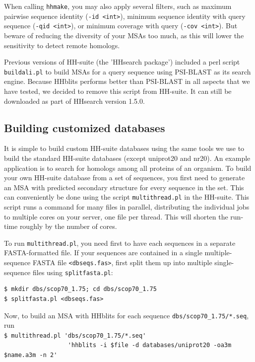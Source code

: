 \documentclass[11pt,a4paper]{article}
\begin{document}
When calling \verb`hhmake`, you may also apply several filters, such as maximum pairwise 
sequence identity (\verb`-id <int>`), minimum sequence identity with query sequence 
(\verb`-qid <int>`), or minimum coverage with query (\verb`-cov <int>`). But beware 
of reducing the diversity of your MSAs too much, as this will lower the sensitivity to
detect remote homologs.

Previous versions of HH-suite (the 'HHsearch package') included a perl script \verb`buildali.pl` to build MSAs for a query sequence using PSI-BLAST as its search engine. Because HHblits performs better than PSI-BLAST in all aspects that we have tested, we decided to remove this script from HH-suite. It can still be downloaded as part of HHsearch version 1.5.0.


\subsection{Building customized databases} \label{building_dbs}

It is simple to build custom HH-suite databases using the same tools we use to build the standard HH-suite databases (except uniprot20 and nr20). An example application is to search for homologs among all proteins of an organism. To build your own HH-suite database from a set of sequences, you first need to generate an MSA with predicted secondary structure for every sequence in the set. This can conveniently be done using the script \verb`multithread.pl` in the HH-suite. This script runs a command for many files in parallel, distributing the individual jobs to multiple cores on your server, one file per thread. This will shorten the run-time roughly by the number of cores. 

To run \verb`multithread.pl`, you need first to have each sequences in a separate FASTA-formatted file. If your sequences are contained in a single multiple-sequence FASTA file \verb`<dbseqs.fas>`, first split them up into multiple single-sequence files using \verb`splitfasta.pl`:
\begin{verbatim}
$ mkdir dbs/scop70_1.75; cd dbs/scop70_1.75
$ splitfasta.pl <dbseqs.fas> 
\end{verbatim}
Now, to build an MSA with HHblits for each sequence \verb`dbs/scop70_1.75/*.seq`, run\\[-1mm]

\verb`$ multithread.pl 'dbs/scop70_1.75/*.seq' `\\
\verb`                  'hhblits -i $file -d databases/uniprot20 -oa3m $name.a3m -n 2'`\\[-1mm]
\end{document}
